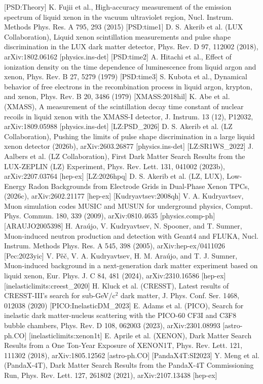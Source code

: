 [PSD:Theory] K. Fujii et al., High-accuracy measurement of the emission spectrum of liquid xenon in the vacuum ultraviolet region, Nucl. Instrum. Methods Phys. Res. A 795, 293 (2015)
[PSD:time1] D. S. Akerib et al. (LUX Collaboration), Liquid xenon scintillation measurements and pulse shape discrimination in the LUX dark matter detector, Phys. Rev. D 97, 112002 (2018), arXiv:1802.06162 [physics.ins-det]
[PSD:time2] A. Hitachi et al., Effect of ionization density on the time dependence of luminescence from liquid argon and xenon, Phys. Rev. B 27, 5279 (1979)
[PSD:time3] S. Kubota et al., Dynamical behavior of free electrons in the recombination process in liquid argon, krypton, and xenon, Phys. Rev. B 20, 3486 (1979)
[XMASS:2018hil] K. Abe et al. (XMASS), A measurement of the scintillation decay time constant of nuclear recoils in liquid xenon with the XMASS-I detector, J. Instrum. 13 (12), P12032, arXiv:1809.05988 [physics.ins-det]
[LZ:PSD_2026] D. S. Akerib et al. (LZ Collaboration), Pushing the limits of pulse shape discrimination in a large liquid xenon detector (2026b), arXiv:2603.26877 [physics.ins-det]
[LZ:SR1WS_2022] J. Aalbers et al. (LZ Collaboration), First Dark Matter Search Results from the LUX-ZEPLIN (LZ) Experiment, Phys. Rev. Lett. 131, 041002 (2023b), arXiv:2207.03764 [hep-ex]
[LZ:2026hpq] D. S. Akerib et al. (LZ, LUX), Low-Energy Radon Backgrounds from Electrode Grids in Dual-Phase Xenon TPCs, (2026c), arXiv:2602.21177 [hep-ex]
[Kudryavtsev:2008qh] V. A. Kudryavtsev, Muon simulation codes MUSIC and MUSUN for underground physics, Comput. Phys. Commun. 180, 339 (2009), arXiv:0810.4635 [physics.comp-ph]
[ARAUJO2005398] H. Araújo, V. Kudryavtsev, N. Spooner, and T. Sumner, Muon-induced neutron production and detection with Geant4 and FLUKA, Nucl. Instrum. Methods Phys. Res. A 545, 398 (2005), arXiv:hep-ex/0411026
[Pec:2023yic] V. Pěč, V. A. Kudryavtsev, H. M. Araújo, and T. J. Sumner, Muon-induced background in a next-generation dark matter experiment based on liquid xenon, Eur. Phys. J. C 84, 481 (2024), arXiv:2310.16586 [hep-ex]
[inelasticlimits:creest_2020] H. Kluck et al. (CRESST), Latest results of CRESST-III's search for sub-GeV/c$^2$ dark matter, J. Phys. Conf. Ser. 1468, 012038 (2020)
[PICO:InelasticDM_2023] E. Adams et al. (PICO), Search for inelastic dark matter-nucleus scattering with the PICO-60 CF3I and C3F8 bubble chambers, Phys. Rev. D 108, 062003 (2023), arXiv:2301.08993 [astro-ph.CO]
[inelasticlimits:xenon1t] E. Aprile et al. (XENON), Dark Matter Search Results from a One Ton-Year Exposure of XENON1T, Phys. Rev. Lett. 121, 111302 (2018), arXiv:1805.12562 [astro-ph.CO]
[PandaX4T:SI2023] Y. Meng et al. (PandaX-4T), Dark Matter Search Results from the PandaX-4T Commissioning Run, Phys. Rev. Lett. 127, 261802 (2021), arXiv:2107.13438 [hep-ex]


